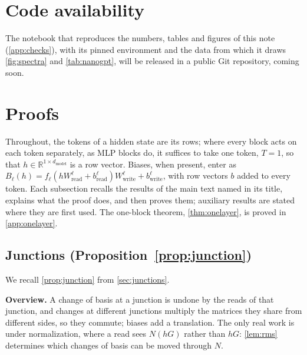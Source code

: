 \documentclass[10pt]{article}
\theoremstyle{definition}
\theoremstyle{remark}
\newcommand{\R}{\mathbb{R}}
\newcommand{\Wread}{W_{\mathrm{read}}}
\newcommand{\Wwrite}{W_{\mathrm{write}}}
\newcommand{\dm}{d_{\mathrm{model}}}
\newcommand{\para}[1]{\smallskip\noindent\textbf{#1}\hspace{0.5em}}
\begin{document}
\section*{Code availability}
The notebook that reproduces the numbers, tables and figures of this note (\cref{app:checks}), with its pinned environment and the data from which it draws \cref{fig:spectra} and \cref{tab:nanogpt}, will be released in a public Git repository, coming soon.





\clearpage
\appendix
\setcounter{topnumber}{3}
\setcounter{totalnumber}{4}
\section{Proofs}\label{app:proofs}

Throughout, the tokens of a hidden state are its rows; where every block acts on each token separately, as MLP blocks do, it suffices to take one token, $T = 1$, so that $h \in \R^{1\times\dm}$ is a row vector. Biases, when present, enter as $B_\ell(h) = f_\ell(h\Wread^{\ell} + b^{\ell}_{\mathrm{read}})\Wwrite^{\ell} + b^{\ell}_{\mathrm{write}}$, with row vectors $b$ added to every token. Each subsection recalls the results of the main text named in its title, explains what the proof does, and then proves them; auxiliary results are stated where they are first used. The one-block theorem, \cref{thm:onelayer}, is proved in \cref{app:onelayer}.

\subsection{Junctions\texorpdfstring{ (Proposition~\ref*{prop:junction})}{}}\label{app:prf-junction}

We recall \cref{prop:junction} from \cref{sec:junctions}.
\propJunction*

\para{Overview.} A change of basis at a junction is undone by the reads of that junction, and changes at different junctions multiply the matrices they share from different sides, so they commute; biases add a translation. The only real work is under normalization, where a read sees $N(hG)$ rather than $hG$: \cref{lem:rms} determines which changes of basis can be moved through $N$.
\end{document}
